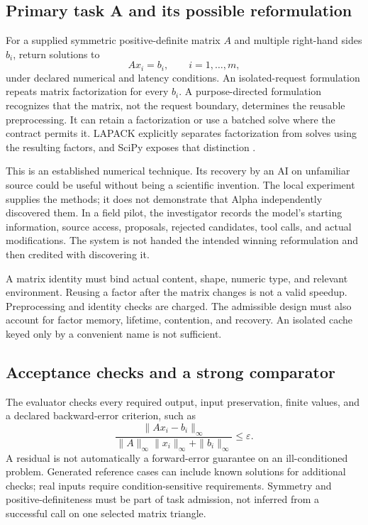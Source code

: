 \documentclass[11pt,letterpaper]{article}
\theoremstyle{remark}\newtheorem{remark}{Remark}[section]
\begin{document}
\subsection{Primary task A and its possible reformulation}
For a supplied symmetric positive-definite matrix $A$ and multiple right-hand sides $b_i$, return solutions to
\begin{equation}
Ax_i=b_i,\qquad i=1,\ldots,m,
\end{equation}
under declared numerical and latency conditions. An isolated-request formulation repeats matrix factorization for every $b_i$. A purpose-directed formulation recognizes that the matrix, not the request boundary, determines the reusable preprocessing. It can retain a factorization or use a batched solve where the contract permits it. LAPACK explicitly separates factorization from solves using the resulting factors, and SciPy exposes that distinction \citep{lapackFactor,lapackSolve,scipyFactor,scipySolve}.

This is an established numerical technique. Its recovery by an AI on unfamiliar source could be useful without being a scientific invention. The local experiment supplies the methods; it does not demonstrate that Alpha independently discovered them. In a field pilot, the investigator records the model's starting information, source access, proposals, rejected candidates, tool calls, and actual modifications. The system is not handed the intended winning reformulation and then credited with discovering it.

A matrix identity must bind actual content, shape, numeric type, and relevant environment. Reusing a factor after the matrix changes is not a valid speedup. Preprocessing and identity checks are charged. The admissible design must also account for factor memory, lifetime, contention, and recovery. An isolated cache keyed only by a convenient name is not sufficient.

\subsection{Acceptance checks and a strong comparator}
The evaluator checks every required output, input preservation, finite values, and a declared backward-error criterion, such as
\begin{equation}\label{eq:residual}
\frac{\|Ax_i-b_i\|_{\infty}}
{\|A\|_{\infty}\|x_i\|_{\infty}+\|b_i\|_{\infty}}
\le\varepsilon.
\end{equation}
A residual is not automatically a forward-error guarantee on an ill-conditioned problem. Generated reference cases can include known solutions for additional checks; real inputs require condition-sensitive requirements. Symmetry and positive-definiteness must be part of task admission, not inferred from a successful call on one selected matrix triangle.
\end{document}
